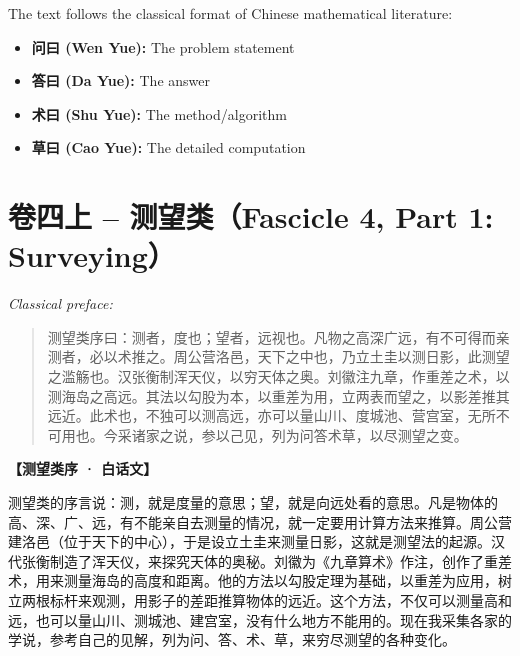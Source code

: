 \documentclass[11pt,a4paper]{article}
\begin{document}
The text follows the classical format of Chinese mathematical literature:
\begin{itemize}
  \item \textbf{问曰 (Wen Yue):} The problem statement
  \item \textbf{答曰 (Da Yue):} The answer
  \item \textbf{术曰 (Shu Yue):} The method/algorithm
  \item \textbf{草曰 (Cao Yue):} The detailed computation
\end{itemize}

\newpage

\section{卷四上 -- 测望类（Fascicle 4, Part 1: Surveying）}
\label{sec:juan4shang}

\noindent\textit{Classical preface:}

\begin{originaltext}
\begin{quote}
\textcolor{origcolor}{%
测望类序曰：测者，度也；望者，远视也。凡物之高深广远，有不可得而亲测者，必以术推之。周公营洛邑，天下之中也，乃立土圭以测日影，此测望之滥觞也。汉张衡制浑天仪，以穷天体之奥。刘徽注九章，作重差之术，以测海岛之高远。其法以勾股为本，以重差为用，立两表而望之，以影差推其远近。此术也，不独可以测高远，亦可以量山川、度城池、营宫室，无所不可用也。今采诸家之说，参以己见，列为问答术草，以尽测望之变。
}
\end{quote}
\end{originaltext}

\begin{moderntext}
\textbf{【测望类序 · 白话文】}

测望类的序言说：测，就是度量的意思；望，就是向远处看的意思。凡是物体的高、深、广、远，有不能亲自去测量的情况，就一定要用计算方法来推算。周公营建洛邑（位于天下的中心），于是设立土圭来测量日影，这就是测望法的起源。汉代张衡制造了浑天仪，来探究天体的奥秘。刘徽为《九章算术》作注，创作了重差术，用来测量海岛的高度和距离。他的方法以勾股定理为基础，以重差为应用，树立两根标杆来观测，用影子的差距推算物体的远近。这个方法，不仅可以测量高和远，也可以量山川、测城池、建宫室，没有什么地方不能用的。现在我采集各家的学说，参考自己的见解，列为问、答、术、草，来穷尽测望的各种变化。
\end{moderntext}
\end{document}

